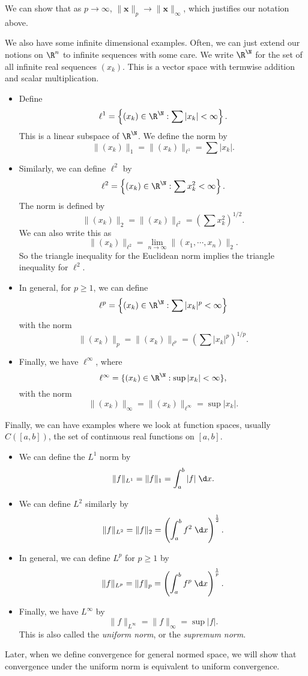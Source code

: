 \documentclass[a4paper]{article}
\begin{document}
\begin{eg}
\begin{itemize}
      We can show that as $p\to \infty$, $\|\mathbf{x}\|_p \to \|\mathbf{x}\|_\infty$, which justifies our notation above.
  \end{itemize}
  We also have some infinite dimensional examples. Often, we can just extend our notions on $\R^n$ to infinite sequences with some care. We write $\R^\N$ for the set of all infinite real sequences $(x_k)$. This is a vector space with termwise addition and scalar multiplication.
  \begin{itemize}
    \item Define
      \[
        \ell^1 = \left\{(x_k) \in \R^\N: \sum |x_k| < \infty\right\}.
      \]
      This is a linear subspace of $\R^\N$. We define the norm by
      \[
        \|(x_k)\|_1 = \|(x_k)\|_{\ell^1} = \sum |x_k|.
      \]
    \item Similarly, we can define $\ell^2$ by
      \[
        \ell^2 = \left\{(x_k) \in \R^\N: \sum x_k^2 < \infty\right\}.
      \]
      The norm is defined by
      \[
        \|(x_k)\|_2 = \|(x_k)\|_{\ell^2} = \left(\sum x_k^2\right)^{1/2}.
      \]
      We can also write this as
      \[
        \|(x_k)\|_{\ell^2} = \lim_{n \to \infty} \|(x_1, \cdots, x_n)\|_2.
      \]
      So the triangle inequality for the Euclidean norm implies the triangle inequality for $\ell^2$.
    \item In general, for $p \geq 1$, we can define
      \[
        \ell^p = \left\{(x_k) \in \R^\N: \sum |x_k|^p < \infty\right\}
      \]
      with the norm
      \[
        \|(x_k)\|_p = \|(x_k)\|_{\ell^p} = \left(\sum |x_k|^p\right)^{1/p}.
      \]
    \item Finally, we have $\ell^\infty$, where
      \[
        \ell^\infty = \{(x_k)\in \R^\N: \sup |x_k| < \infty\},
      \]
      with the norm
      \[
        \|(x_k)\|_\infty = \|(x_k)\|_{\ell^\infty} = \sup |x_k|.
      \]
  \end{itemize}
  Finally, we can have examples where we look at function spaces, usually $C([a, b])$, the set of continuous real functions on $[a, b]$.
  \begin{itemize}
    \item We can define the $L^1$ norm by
      \[
        \|f\|_{L^1} = \|f\|_1 = \int_a^b |f|\;\d x.
      \]
    \item We can define $L^2$ similarly by
      \[
        \|f\|_{L^2} = \|f\|_2 = \left(\int_a^b f^2 \;\d x\right)^{\frac{1}{2}}.
      \]
    \item In general, we can define $L^p$ for $p \geq 1$ by
      \[
        \|f\|_{L^p} = \|f\|_p = \left(\int_a^b f^p \;\d x\right)^{\frac{1}{p}}.
      \]
    \item Finally, we have $L^\infty$ by
      \[
        \|f\|_{L^\infty} = \|f\|_\infty = \sup |f|.
      \]
      This is also called the \emph{uniform norm}, or the \emph{supremum norm}.
  \end{itemize}
\end{eg}
Later, when we define convergence for general normed space, we will show that convergence under the uniform norm is equivalent to uniform convergence.
\end{document}
